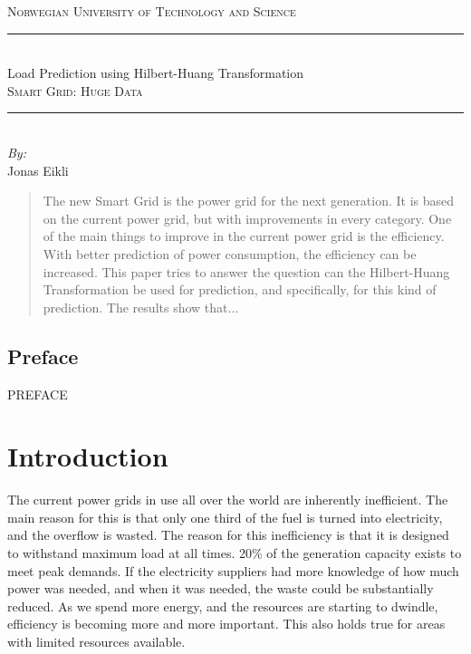 \documentclass[12pt]{article}
\newcommand{\HRule}{\rule{\linewidth}{0.5mm}}
\begin{document}
\begin{titlepage}
\begin{center}
\thispagestyle{empty}

\textsc{\large Norwegian University of Technology and Science} \\

\vspace{2cm}

\HRule\\[0.5cm]
{\Huge Load Prediction using Hilbert-Huang Transformation}\\[1cm]
\textsc{\large{Smart Grid: Huge Data}}
\HRule\\[3.5cm]

\vspace{5cm}
{\large \emph{By:}}\\
Jonas Eikli\\

\vfill


\end{center}
\end{titlepage}
\newpage


\begin{abstract}
The new Smart Grid is the power grid for the next generation. It is based on the current power grid, but with improvements in every category. One of the main things to improve in the current power grid is the efficiency. With better prediction of power consumption, the efficiency can be increased. This paper tries to answer the question can the Hilbert-Huang Transformation be used for prediction, and specifically, for this kind of prediction. The results show that...


\end{abstract}
\newpage

\subsection*{Preface}
PREFACE




\newpage
\tableofcontents
\newpage
\listoffigures
\newpage
\listoftables
\newpage
\section{Introduction}
\label{introduction}

The current power grids in use all over the world are inherently inefficient. The main reason for this is that only one third of the fuel is turned into electricity, and the overflow is wasted.  The reason for this inefficiency is that it is designed to withstand maximum load at all times. 20\% of the generation capacity exists to meet peak demands. If the electricity suppliers had more knowledge of how much power was needed, and when it was needed, the waste could be substantially reduced. As we spend more energy, and the resources are starting to dwindle, efficiency is becoming more and more important. This also holds true for areas with limited resources available.
\end{document}
